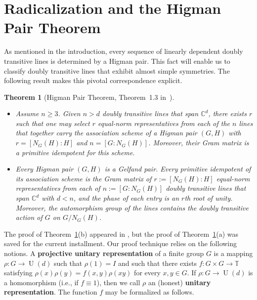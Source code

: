 \documentclass[11pt]{article}
\newtheorem{theorem}[theo]{Theorem}
\theoremstyle{definition}
\numberwithin{equation}{section}
\begin{document}
\section{Radicalization and the Higman Pair Theorem}

As mentioned in the introduction, every sequence of linearly dependent doubly transitive lines is determined by a Higman pair.
This fact will enable us to classify doubly transitive lines that exhibit almost simple symmetries.
The following result makes this pivotal correspondence explicit.

\begin{theorem}[Higman Pair Theorem, Theorem~1.3 in~\cite{IversonM:18}]\
\label{thm.Higman Pair Theorem}
\begin{itemize}
\item[(a)]
Assume $n\geq 3$.
Given $n>d$ doubly transitive lines that span $\mathbb{C}^d$, there exists $r$ such that one may select $r$ equal-norm representatives from each of the $n$ lines that together carry the association scheme of a Higman pair $(G,H)$ with $r=[N_G(H):H]$ and $n=[G:N_G(H)]$.
Moreover, their Gram matrix is a primitive idempotent for this scheme.
\item[(b)]
Every Higman pair $(G,H)$ is a Gelfand pair.
Every primitive idempotent of its association scheme is the Gram matrix of $r:=[N_G(H):H]$ equal-norm representatives from each of $n:=[G:N_G(H)]$ doubly transitive lines that span $\mathbb{C}^d$ with $d<n$, and the phase of each entry is an $r$th root of unity.
Moreover, the automorphism group of the lines contains the doubly transitive action of $G$ on $G/N_G(H)$.
\end{itemize}
\end{theorem}

The proof of Theorem~\ref{thm.Higman Pair Theorem}(b) appeared in \cite{IversonM:18}, but the proof of Theorem~\ref{thm.Higman Pair Theorem}(a) was saved for the current installment.
Our proof technique relies on the following notions.
A \textbf{projective unitary representation} of a finite group $G$ is a mapping $\rho \colon G \to \operatorname{U}(d)$ such that $\rho(1) = I$ and such that there exists $f \colon G \times G \to \mathbb{T}$ satisfying $\rho(x)\rho(y) = f(x,y) \rho(xy)$ for every $x,y \in G$.
If $\rho\colon G \to \operatorname{U}(d)$ is a homomorphism (i.e., if $f \equiv 1$), then we call $\rho$ an (honest) \textbf{unitary representation}.
The function $f$ may be formalized as follows.
\end{document}
